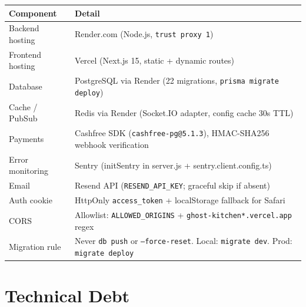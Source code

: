 \documentclass[11pt,a4paper]{article}
\begin{document}
\begin{tabularx}{\textwidth}{@{}p{3.5cm}X@{}}
\toprule
\rowcolor{navyblue}\color{white}\bfseries Component & \color{white}\bfseries Detail \\
\midrule
Backend hosting     & Render.com (Node.js, \texttt{trust proxy 1}) \\
\rowcolor{rowalt}
Frontend hosting    & Vercel (Next.js 15, static + dynamic routes) \\
Database            & PostgreSQL via Render (22 migrations, \texttt{prisma migrate deploy}) \\
\rowcolor{rowalt}
Cache / PubSub      & Redis via Render (Socket.IO adapter, config cache 30s TTL) \\
Payments            & Cashfree SDK (\texttt{cashfree-pg@5.1.3}), HMAC-SHA256 webhook verification \\
\rowcolor{rowalt}
Error monitoring    & Sentry (initSentry in server.js + sentry.client.config.ts) \\
Email               & Resend API (\texttt{RESEND\_API\_KEY}; graceful skip if absent) \\
\rowcolor{rowalt}
Auth cookie         & HttpOnly \texttt{access\_token} + localStorage fallback for Safari \\
CORS                & Allowlist: \texttt{ALLOWED\_ORIGINS} + \texttt{ghost-kitchen*.vercel.app} regex \\
\rowcolor{rowalt}
Migration rule      & Never \texttt{db push} or \texttt{--force-reset}. Local: \texttt{migrate dev}. Prod: \texttt{migrate deploy} \\
\bottomrule
\end{tabularx}

\section{Technical Debt}
\end{document}

